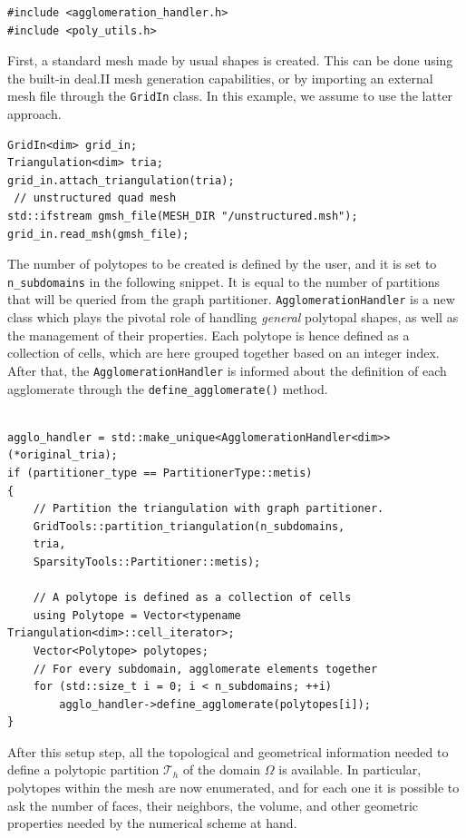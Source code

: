 \documentclass[a4paper,12pt]{article}
\begin{document}
\begin{lstlisting}[caption=New header files]
#include <agglomeration_handler.h>
#include <poly_utils.h>
\end{lstlisting}


First, a standard mesh made by usual shapes is created. This can be done using the built-in deal.II mesh generation capabilities,
or by importing an external mesh file through the \texttt{GridIn} class. In this example, we assume to use the latter approach.

\begin{lstlisting}[caption=Importing an external mesh]
GridIn<dim> grid_in;
Triangulation<dim> tria;
grid_in.attach_triangulation(tria);
 // unstructured quad mesh
std::ifstream gmsh_file(MESH_DIR "/unstructured.msh");
grid_in.read_msh(gmsh_file);
\end{lstlisting}

The number of polytopes to be created is defined by the user, and it is set to \texttt{n\_subdomains} in the following snippet. It is equal
to the number of partitions that will be queried from the graph partitioner. \texttt{AgglomerationHandler} is a new class which plays the pivotal role of
handling \emph{general} polytopal shapes, as well as the management of their properties. Each polytope is hence defined as a collection of cells, which are here grouped together based on an integer index. After
that, the \texttt{AgglomerationHandler} is informed about the definition of each agglomerate through the \texttt{define\_agglomerate()} method.

\begin{lstlisting}[caption=Creation of polytopal elements]
    
agglo_handler = std::make_unique<AgglomerationHandler<dim>>(*original_tria);
if (partitioner_type == PartitionerType::metis)
{
    // Partition the triangulation with graph partitioner.
    GridTools::partition_triangulation(n_subdomains,
    tria,
    SparsityTools::Partitioner::metis);

    // A polytope is defined as a collection of cells
    using Polytope = Vector<typename Triangulation<dim>::cell_iterator>;
    Vector<Polytope> polytopes;
    // For every subdomain, agglomerate elements together
    for (std::size_t i = 0; i < n_subdomains; ++i)
        agglo_handler->define_agglomerate(polytopes[i]);
}
\end{lstlisting}

After this setup step, all the topological and geometrical information needed to define a polytopic partition $\mathcal{T}_h$ of
the domain $\Omega$ is available. In particular, polytopes within the mesh are now enumerated, and for each one
it is possible to ask the number of faces, their neighbors, the volume, and other geometric properties needed by the numerical scheme
at hand.
\end{document}
